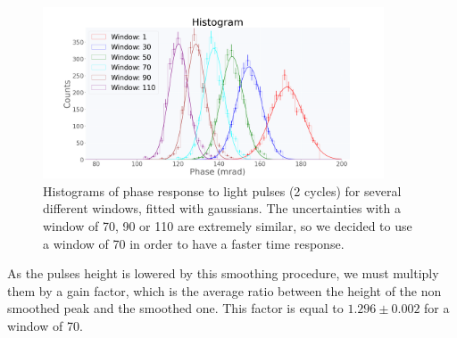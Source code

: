 \documentclass[12pt]{article}
\begin{document}
\begin{figure}[H]
\centering
\includegraphics[width=0.9\textwidth]{choose_window.png}
\caption{Histograms of phase response to light pulses (2 cycles) for several different windows, fitted with gaussians. The uncertainties with a window of 70, 90 or 110 are extremely similar, so we decided to use a window of 70 in order to have a faster time response.}
\end{figure}
As the pulses height is lowered by this smoothing procedure, we must multiply them by a gain factor, which is the average ratio between the height of the non smoothed peak and the smoothed one. This factor is equal to $1.296 \pm 0.002$ for a window of 70.
\end{document}
